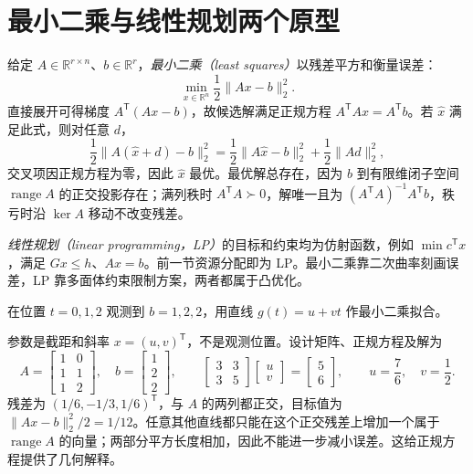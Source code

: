 \section{最小二乘与线性规划两个原型}

给定 $A\in\mathbb R^{r\times n}$、$b\in\mathbb R^r$，\emph{最小二乘（least squares）}以残差平方和衡量误差：
\begin{equation}
 \min_{x\in\mathbb R^n}\frac12\|Ax-b\|_2^2.
 \label{eq:co-least-squares}
\end{equation}
直接展开可得梯度 $A^{\mathsf T}(Ax-b)$，故候选解满足正规方程 $A^{\mathsf T}Ax=A^{\mathsf T}b$。若 $\widehat x$ 满足此式，则对任意 $d$，
\[
 \frac12\|A(\widehat x+d)-b\|_2^2
 =\frac12\|A\widehat x-b\|_2^2+\frac12\|Ad\|_2^2,
\]
交叉项因正规方程为零，因此 $\widehat x$ 最优。最优解总存在，因为 $b$ 到有限维闭子空间 $\operatorname{range}A$ 的正交投影存在；满列秩时 $A^{\mathsf T}A\succ0$，解唯一且为 $(A^{\mathsf T}A)^{-1}A^{\mathsf T}b$，秩亏时沿 $\ker A$ 移动不改变残差。

\emph{线性规划（linear programming，LP）}的目标和约束均为仿射函数，例如 $\min c^{\mathsf T}x$，满足 $Gx\leq h$、$Ax=b$。前一节资源分配即为 LP。最小二乘靠二次曲率刻画误差，LP 靠多面体约束限制方案，两者都属于凸优化。

\begin{example}[一条拟合直线的完整计算]
在位置 $t=0,1,2$ 观测到 $b=1,2,2$，用直线 $g(t)=u+vt$ 作最小二乘拟合。
\end{example}
\begin{solve}
参数是截距和斜率 $x=(u,v)^{\mathsf T}$，不是观测位置。设计矩阵、正规方程及解为
\[
 A=\begin{bmatrix}1&0\\1&1\\1&2\end{bmatrix},\quad
 b=\begin{bmatrix}1\\2\\2\end{bmatrix},\qquad
 \begin{bmatrix}3&3\\3&5\end{bmatrix}
 \begin{bmatrix}u\\v\end{bmatrix}
 =\begin{bmatrix}5\\6\end{bmatrix},\qquad
 u=\frac76,\quad v=\frac12.
\]
残差为 $(1/6,-1/3,1/6)^{\mathsf T}$，与 $A$ 的两列都正交，目标值为 $\|Ax-b\|_2^2/2=1/12$。任意其他直线都只能在这个正交残差上增加一个属于 $\operatorname{range}A$ 的向量；两部分平方长度相加，因此不能进一步减小误差。这给正规方程提供了几何解释。
\end{solve}

